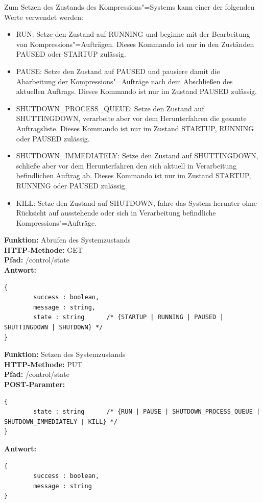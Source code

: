 Zum Setzen des Zustands des Kompressions"=Systems kann einer der folgenden Werte verwendet werden:
\begin{itemize}
\item {\ttfamily RUN:} Setze den Zustand auf {\ttfamily RUNNING} und beginne mit der Bearbeitung von Kompressions"=Aufträgen. Dieses Kommando ist nur in den Zuständen {\ttfamily PAUSED} oder {\ttfamily STARTUP} zulässig.
\item {\ttfamily PAUSE:} Setze den Zustand auf {\ttfamily PAUSED} und pausiere damit die Abarbeitung der Kompressions"=Aufträge nach dem Abschließen des aktuellen Auftrags. Dieses Kommando ist nur im Zustand {\ttfamily PAUSED} zulässig.
\item {\ttfamily SHUTDOWN\_PROCESS\_QUEUE:} Setze den Zustand auf {\ttfamily SHUTTINGDOWN}, verarbeite aber vor dem Herunterfahren die gesamte Auftragsliste. Dieses Kommando ist nur im Zustand {\ttfamily STARTUP}, {\ttfamily RUNNING} oder {\ttfamily PAUSED} zulässig.
\item {\ttfamily SHUTDOWN\_IMMEDIATELY:} Setze den Zustand auf {\ttfamily SHUTTINGDOWN}, schließe aber vor dem Herunterfahren den sich aktuell in Verarbeitung befindlichen Auftrag ab.  Dieses Kommando ist nur im Zustand {\ttfamily STARTUP}, {\ttfamily RUNNING} oder {\ttfamily PAUSED} zulässig.
\item {\ttfamily KILL}: Setze den Zustand auf {\ttfamily SHUTDOWN}, fahre das System herunter ohne Rücksicht auf ausstehende oder sich in Verarbeitung befindliche Kompressions"=Aufträge.
\end{itemize}

\noindent\textbf{Funktion: }Abrufen des Systemzustands \\
\textbf{HTTP-Methode: } {\ttfamily GET} \\
\textbf{Pfad: } {\ttfamily /control/state} \\
\textbf{Antwort: }
\begin{lstlisting}[caption={Antwort auf das Abrufen des Systemzustands}]
{
		success : boolean,
		message : string,
		state : string		/* {STARTUP | RUNNING | PAUSED | SHUTTINGDOWN | SHUTDOWN} */
}
\end{lstlisting}

\noindent\textbf{Funktion: }Setzen des Systemzustands \\
\textbf{HTTP-Methode: } {\ttfamily PUT} \\
\textbf{Pfad: } {\ttfamily /control/state} \\
\textbf{POST-Paramter: }
\begin{lstlisting}[caption={POST-Parameter zum Setzen des Systemzustands}]
{
		state : string   	/* {RUN | PAUSE | SHUTDOWN_PROCESS_QUEUE | SHUTDOWN_IMMEDIATELY | KILL} */
}
\end{lstlisting}
\textbf{Antwort: }
\begin{lstlisting}[caption={Antwort auf das Setzen des Systemzustands}]
{
		success : boolean,
		message : string
}
\end{lstlisting}

